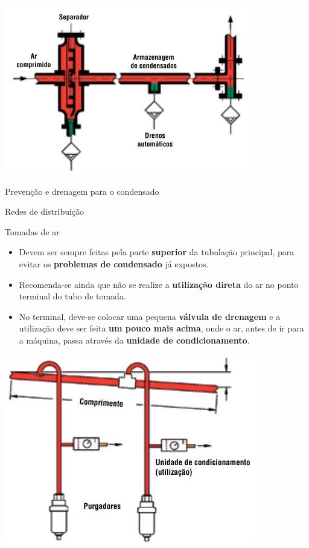\begin{frame}{}
	\centering
	\includegraphics[width=0.9\linewidth]{Figuras/Ch13/fig12}
	
	Prevenção e drenagem para o condensado
\end{frame}


\begin{frame}{Redes de distribuição}
	\begin{block}{Tomadas de ar}
		\begin{itemize}
			\item Devem ser sempre feitas pela parte \textbf{superior} da tubulação principal, para evitar os \textbf{problemas de condensado} já expostos.
			\item Recomenda-se ainda que não se realize a \textbf{utilização direta} do ar no ponto terminal do tubo de tomada.
			\item No terminal, deve-se colocar uma pequena \textbf{válvula de drenagem} e a utilização deve ser feita \textbf{um pouco mais acima}, onde o ar, antes de ir para a máquina, passa através da \textbf{unidade de condicionamento}.
		\end{itemize}
	
	\end{block}

	\centering
	\includegraphics[width=0.4\linewidth]{Figuras/Ch13/fig13}

\end{frame}


